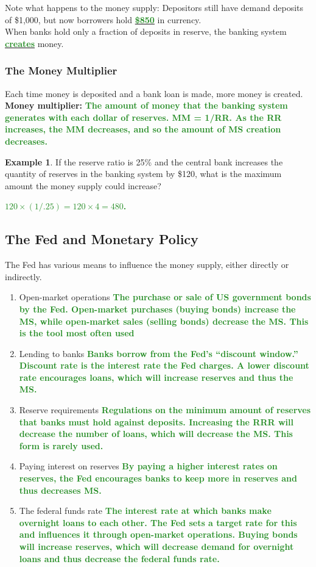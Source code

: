 \documentclass[11pt]{article}\usepackage[]{graphicx}\usepackage[]{color}
\theoremstyle{definition}
\newtheorem{exmp}{Example}[section]
\newcommand{\blank}[1]{}
\newcommand{\ddp}[1]{{\textbf{\textcolor{ForestGreen}{#1}}}}
\newcommand{\dd}[1]{{\underline{\textbf{\textcolor{ForestGreen}{#1}}}}}
\newcommand{\defn}[1]{\textbf{#1}}
\begin{document}
Note what happens to the money supply: Depositors still have demand deposits of \$1,000, but now borrowers hold \dd{\$850} in currency. 
\\

When banks hold only a fraction of deposits in reserve, the banking system \dd{creates} money.

\subsubsection*{The Money Multiplier}

Each time money is deposited and a bank loan is made, more money is created. 
\\

\defn{Money multiplier:} \ddp{The amount of money that the banking system generates with each dollar of reserves. MM = 1/RR. As the RR increases, the MM decreases, and so the amount of MS creation decreases.}

\begin{exmp} 
	If the reserve ratio is 25\% and the central bank increases the quantity of reserves in the banking system by \$120, what is the maximum amount the money supply could increase?
\end{exmp}
\blank{}
\ddp{$120 \times (1/.25) = 120 \times 4 = 480$.}

\subsection{The Fed and Monetary Policy}

The Fed has various means to influence the money supply, either directly or indirectly.

\begin{enumerate}
	\setlength{\itemsep}{1.5em}
	\item Open-market operations \ddp{The purchase or sale of US government bonds by the Fed. Open-market purchases (buying bonds) increase the MS, while open-market sales (selling bonds) decrease the MS. This is the tool most often used}
	\item Lending to banks \ddp{Banks borrow from the Fed's ``discount window.'' Discount rate is the interest rate the Fed charges. A lower discount rate encourages loans, which will increase reserves and thus the MS.}
	\item Reserve requirements \ddp{Regulations on the minimum amount of reserves that banks must hold against deposits. Increasing the RRR will decrease the number of loans, which will decrease the MS. This form is rarely used.}
	\item Paying interest on reserves \ddp{By paying a higher interest rates on reserves, the Fed encourages banks to keep more in reserves and thus decreases MS.}
	\item The federal funds rate \ddp{The interest rate at which banks make overnight loans to each other. The Fed sets a target rate for this and influences it through open-market operations. Buying bonds will increase reserves, which will decrease demand for overnight loans and thus decrease the federal funds rate.}
\end{enumerate}
\end{document}
